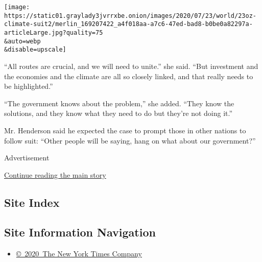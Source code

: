 \texttt{[image: https://static01.graylady3jvrrxbe.onion/images/2020/07/23/world/23oz-climate-suit2/merlin\_169207422\_a4f018aa-a7c6-47ed-bad8-b0be0a82297a-articleLarge.jpg?quality=75\\\&auto=webp\\\&disable=upscale]}

``All routes are crucial, and we will need to unite.'' she said. ``But
investment and the economies and the climate are all so closely linked,
and that really needs to be highlighted.''

``The government knows about the problem,'' she added. ``They know the
solutions, and they know what they need to do but they're not doing
it.''

Mr. Henderson said he expected the case to prompt those in other nations
to follow suit: ``Other people will be saying, hang on what about our
government?''

Advertisement

\protect\hyperlink{after-bottom}{Continue reading the main story}

\hypertarget{site-index}{%
\subsection{Site Index}\label{site-index}}

\hypertarget{site-information-navigation}{%
\subsection{Site Information
Navigation}\label{site-information-navigation}}

\begin{itemize}
\tightlist
\item
  \href{https://help.nytimes3xbfgragh.onion/hc/en-us/articles/115014792127-Copyright-notice}{©~2020~The
  New York Times Company}
\end{itemize}

